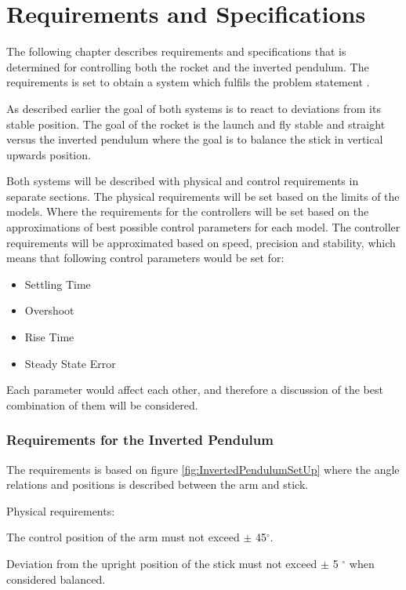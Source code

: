 \chapter{Requirements and Specifications}
The following chapter describes requirements and specifications that is determined for controlling both the rocket and the inverted pendulum. The requirements is set to obtain a system which fulfils the problem statement .

As described earlier the goal of both systems is to react to deviations from its stable position. The goal of the rocket is the launch and fly stable and straight versus the inverted pendulum where the goal is to balance the stick in vertical upwards position.  

Both systems will be described with physical and control requirements in separate sections. The physical requirements will be set based on the limits of the models. Where the requirements for the controllers will be set based on the approximations of best possible control parameters for each model.  
The controller requirements will be approximated based on speed, precision and stability, which means that following control parameters would be set for:

\begin{itemize}[noitemsep]
\item Settling Time
\item Overshoot
\item Rise Time
\item Steady State Error
\end{itemize}

Each parameter would affect each other, and therefore a discussion of the best combination of them will be considered.

\subsection{Requirements for the Inverted Pendulum}
The requirements is based on figure \ref{fig:InvertedPendulumSetUp} where the angle relations and positions is described between the arm and stick.

 
Physical requirements:


The control position of the arm must not exceed $\pm$ 45$^{\circ}$. 


Deviation from the upright position of the stick must not exceed $\pm$ 5 $^{\circ}$ when considered balanced.


